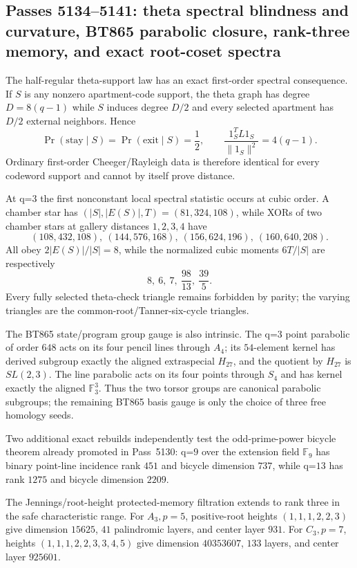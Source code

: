 \ifdefined\WPassFiveOneThreeFourLoaded\else
\gdef\WPassFiveOneThreeFourLoaded{1}
\subsection*{Passes 5134--5141: theta spectral blindness and curvature, BT865 parabolic closure, rank-three memory, and exact root-coset spectra}
The half-regular theta-support law has an exact first-order spectral consequence.  If $S$ is any nonzero apartment-code support, the theta graph has degree $D=8(q-1)$ while $S$ induces degree $D/2$ and every selected apartment has $D/2$ external neighbors.  Hence
\[
 \Pr(\mathrm{stay}\mid S)=\Pr(\mathrm{exit}\mid S)=\frac12,
 \qquad
 \frac{1_S^TL1_S}{\lVert1_S\rVert^2}=4(q-1).
\]
Ordinary first-order Cheeger/Rayleigh data is therefore identical for every codeword support and cannot by itself prove distance.

At q=3 the first nonconstant local spectral statistic occurs at cubic order.  A chamber star has $(|S|,|E(S)|,T)=(81,324,108)$, while XORs of two chamber stars at gallery distances $1,2,3,4$ have
\[
 (108,432,108),\ (144,576,168),\ (156,624,196),\ (160,640,208).
\]
All obey $2|E(S)|/|S|=8$, while the normalized cubic moments $6T/|S|$ are respectively
\[
 8,\ 6,\ 7,\ \frac{98}{13},\ \frac{39}{5}.
\]
Every fully selected theta-check triangle remains forbidden by parity; the varying triangles are the common-root/Tanner-six-cycle triangles.

The BT865 state/program group gauge is also intrinsic.  The q=3 point parabolic of order $648$ acts on its four pencil lines through $A_4$; its $54$-element kernel has derived subgroup exactly the aligned extraspecial $H_{27}$, and the quotient by $H_{27}$ is $SL(2,3)$.  The line parabolic acts on its four points through $S_4$ and has kernel exactly the aligned $\mathbb F_3^3$.  Thus the two torsor groups are canonical parabolic subgroups; the remaining BT865 basis gauge is only the choice of three free homology seeds.

Two additional exact rebuilds independently test the odd-prime-power bicycle theorem already promoted in Pass~5130: q=$9$ over the extension field $\mathbb F_9$ has binary point-line incidence rank $451$ and bicycle dimension $737$, while q=$13$ has rank $1275$ and bicycle dimension $2209$.

The Jennings/root-height protected-memory filtration extends to rank three in the safe characteristic range.  For $A_3,p=5$, positive-root heights $(1,1,1,2,2,3)$ give dimension $15625$, $41$ palindromic layers, and center layer $931$.  For $C_3,p=7$, heights $(1,1,1,2,2,3,3,4,5)$ give dimension $40353607$, $133$ layers, and center layer $925601$.

